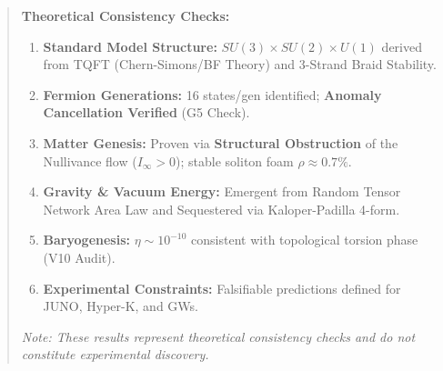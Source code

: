 \documentclass[a4paper,12pt]{article}
\begin{document}
\begin{abstract}
\begin{mdframed}[backgroundcolor=blue!5, frametitle={Status Update (Verification Campaign, February 2026 --- historical; see the Reader's Guide for the current status table)}]
\textbf{Theoretical Consistency Checks:}
\begin{enumerate}
    \item[(i)] \textbf{Standard Model Structure:} $SU(3) \times SU(2) \times U(1)$ derived from TQFT (Chern-Simons/BF Theory) and 3-Strand Braid Stability.
    \item[(ii)] \textbf{Fermion Generations:} 16 states/gen identified; \textbf{Anomaly Cancellation Verified} (G5 Check).
    \item[(iii)] \textbf{Matter Genesis:} Proven via \textbf{Structural Obstruction} of the Nullivance flow ($I_\infty > 0$); stable soliton foam $\rho \approx 0.7\%$.
    \item[(iv)] \textbf{Gravity \& Vacuum Energy:} Emergent from Random Tensor Network Area Law and Sequestered via Kaloper-Padilla 4-form.
    \item[(v)] \textbf{Baryogenesis:} $\eta \sim 10^{-10}$ consistent with topological torsion phase (V10 Audit).
    \item[(vi)] \textbf{Experimental Constraints:} Falsifiable predictions defined for JUNO, Hyper-K, and GWs.
\end{enumerate}
\textit{Note: These results represent theoretical consistency checks and do not constitute experimental discovery.}
\end{mdframed}


\end{abstract}
\end{document}
